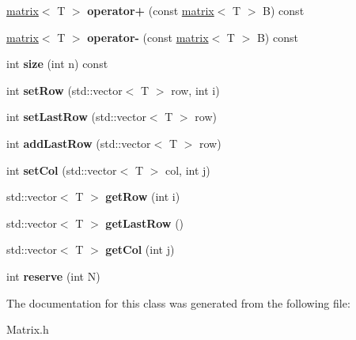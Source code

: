 \begin{DoxyCompactItemize}
\item 
\hypertarget{classkeycpp_1_1matrix_a30e23cbddecec8be4dd89d7c3d36e611}{\hyperlink{classkeycpp_1_1matrix}{matrix}$<$ T $>$ {\bfseries operator+} (const \hyperlink{classkeycpp_1_1matrix}{matrix}$<$ T $>$ B) const }\label{classkeycpp_1_1matrix_a30e23cbddecec8be4dd89d7c3d36e611}

\item 
\hypertarget{classkeycpp_1_1matrix_abb5d07fed06a0d51ea0203c91e1c52bf}{\hyperlink{classkeycpp_1_1matrix}{matrix}$<$ T $>$ {\bfseries operator-\/} (const \hyperlink{classkeycpp_1_1matrix}{matrix}$<$ T $>$ B) const }\label{classkeycpp_1_1matrix_abb5d07fed06a0d51ea0203c91e1c52bf}

\item 
\hypertarget{classkeycpp_1_1matrix_a380afb3099fc7955b143602ddc17a28f}{int {\bfseries size} (int n) const }\label{classkeycpp_1_1matrix_a380afb3099fc7955b143602ddc17a28f}

\item 
\hypertarget{classkeycpp_1_1matrix_a133bb88c69cddc6c1e2dcdbdbbe3ce4f}{int {\bfseries set\-Row} (std\-::vector$<$ T $>$ row, int i)}\label{classkeycpp_1_1matrix_a133bb88c69cddc6c1e2dcdbdbbe3ce4f}

\item 
\hypertarget{classkeycpp_1_1matrix_ac1d7804d1af7f4376572a51fcdf112e4}{int {\bfseries set\-Last\-Row} (std\-::vector$<$ T $>$ row)}\label{classkeycpp_1_1matrix_ac1d7804d1af7f4376572a51fcdf112e4}

\item 
\hypertarget{classkeycpp_1_1matrix_a00cf9c7b83e6b4e1e156b339b98297a5}{int {\bfseries add\-Last\-Row} (std\-::vector$<$ T $>$ row)}\label{classkeycpp_1_1matrix_a00cf9c7b83e6b4e1e156b339b98297a5}

\item 
\hypertarget{classkeycpp_1_1matrix_a8a88af29e0e193d495b7c0146397aeda}{int {\bfseries set\-Col} (std\-::vector$<$ T $>$ col, int j)}\label{classkeycpp_1_1matrix_a8a88af29e0e193d495b7c0146397aeda}

\item 
\hypertarget{classkeycpp_1_1matrix_a0946b26c2ba7fb7d427f2f8b766f74d5}{std\-::vector$<$ T $>$ {\bfseries get\-Row} (int i)}\label{classkeycpp_1_1matrix_a0946b26c2ba7fb7d427f2f8b766f74d5}

\item 
\hypertarget{classkeycpp_1_1matrix_a940e406656b5c3ad3e8f1296e2d47fc5}{std\-::vector$<$ T $>$ {\bfseries get\-Last\-Row} ()}\label{classkeycpp_1_1matrix_a940e406656b5c3ad3e8f1296e2d47fc5}

\item 
\hypertarget{classkeycpp_1_1matrix_a9ba947125ca3c1fd98b1cf8e50e289ca}{std\-::vector$<$ T $>$ {\bfseries get\-Col} (int j)}\label{classkeycpp_1_1matrix_a9ba947125ca3c1fd98b1cf8e50e289ca}

\item 
\hypertarget{classkeycpp_1_1matrix_aedf9ec6e9bd1d3edc4152b8caf88b33f}{int {\bfseries reserve} (int N)}\label{classkeycpp_1_1matrix_aedf9ec6e9bd1d3edc4152b8caf88b33f}

\end{DoxyCompactItemize}


The documentation for this class was generated from the following file\-:\begin{DoxyCompactItemize}
\item 
Matrix.\-h\end{DoxyCompactItemize}

